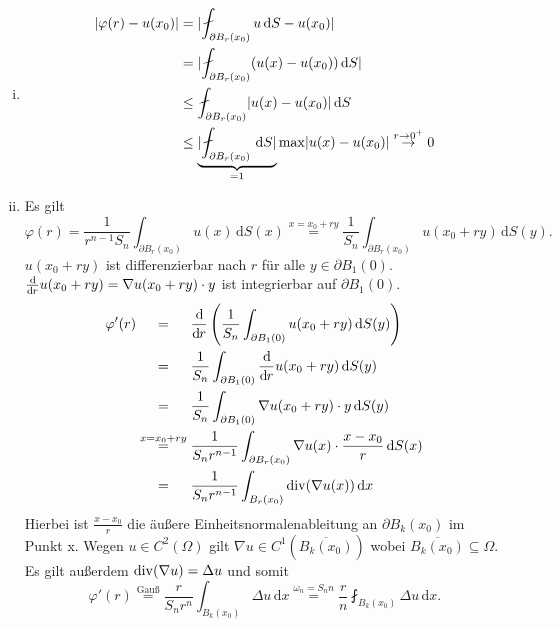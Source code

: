 	\begin{beweis}
		\begin{enumerate}[(i)]
			\item \begin{align*}
				\abs{ \varphi(r)-u(x_0)} &= \abs{ \fint_{\partial B_r(x_0)}^{}u \,\mathrm{d}S - u(x_0)} \\
				&= \abs{ \fint_{\partial B_r(x_0)}^{} (u(x)-u(x_0)) \,\mathrm{d}S} \\
				& \leq \fint_{\partial B_r(x_0)}^{} \abs{u(x)-u(x_0)} \,\mathrm{d}S \\
				& \leq  \underset{=1}{\underbrace{\abs{\fint_{\partial B_r(x_0)}^{} \,\mathrm{d}S}}} \max \abs{u(x)-u(x_0)} \stackrel{r \to 0^+}{\to} 0
			\end{align*}
		\item Es gilt
		\begin{equation}
			\varphi(r) = \frac{1}{r^{n-1}S_n} \int_{\partial B_r(x_0)}^{}u(x) \,\mathrm{d}S(x) \stackrel{x=x_0 + r y}{=} \frac{1}{S_n} \int_{\partial B_r(x_0)}^{} u(x_0 + ry) \,\mathrm{d}S(y).
		\end{equation}
		$u(x_0 + ry)$ ist differenzierbar nach $r$ für alle $y \in \partial B_1(0)$. \\
		$\frac{\mathrm{d}\mkern-1.0mu }{\mathrm{d}\mkern-1.0mu r} u(x_0 + ry) =  \nabla u(x_0+ry) \cdot y$ ist integrierbar auf $ \partial B_1(0)$.
		\begin{align*}
			\varphi'(r) &\stackrel{\hphantom{x=x_0+ry}}{=} \frac{\mathrm{d}\mkern-1.0mu }{\mathrm{d}\mkern-1.0mu r}  \left( \frac{1}{S_n} \int_{\partial B_1(0)}^{} u(x_0 + ry) \,\mathrm{d}S(y) \right) \\
			& \stackrel{\hphantom{x=x_0+ry}}{=} \frac{1}{S_n} \int_{\partial B_1(0)}^{} \frac{\mathrm{d}\mkern-1.0mu }{\mathrm{d}\mkern-1.0mu r}  u(x_0 + ry) \,\mathrm{d}S(y) \\
			& \stackrel{\hphantom{x=x_0+ry}}{=} \frac{1}{S_n} \int_{\partial B_1(0)}^{} \nabla u(x_0 + r y) \cdot y \,\mathrm{d}S(y) \\
			& \stackrel{x=x_0+ry}{=} \frac{1}{S_n r^{n-1}} \int_{\partial B_r(x_0)}^{}  \nabla u(x) \cdot \frac{x-x_0}{r} \,\mathrm{d}S(x) \\
			&\stackrel{\hphantom{x=x_0+ry}}{=} \frac{1}{S_n r^{n-1}} \int_{ B_r(x_0)}^{} \operatorname{div} (  \nabla u(x)) \,\mathrm{d}x
		\end{align*}
		Hierbei ist $\frac{x-x_0}{r}$ die äußere Einheitsnormalenableitung an $\partial B_k(x_0)$ im Punkt x. 
		Wegen $u \in C^2(\Omega)$ gilt $ \nabla u \in C^1( \overline{B_k(x_0)})$ wobei $\overline{B_k(x_0)} \subseteq \Omega$. \\
		Es gilt außerdem $\operatorname{div}(  \nabla u) = \Delta u$ und somit
		\begin{equation}
			\varphi'(r) \stackrel{\text{Gauß}}{=} \frac{r}{S_n r^n} \int_{B_k(x_0)}^{} \Delta u \,\mathrm{d}x 
			\stackrel{\omega_n = S_n n}{=} \frac{r}{n} \fint_{B_k(x_0)}^{} \Delta u \,\mathrm{d}x.
		\end{equation}
		\end{enumerate}
		
	\end{beweis}
